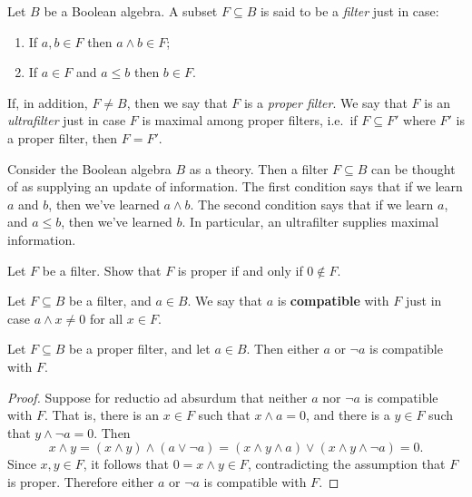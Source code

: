 \begin{defn} Let $B$ be a Boolean algebra.  A subset $F\subseteq B$ is
  said to be a \emph{filter} just in case:
\begin{enumerate}
\item If $a,b\in F$ then $a\wedge b\in F$;
\item If $a\in F$ and $a\leq b$ then $b\in F$.
\end{enumerate}
If, in addition, $F\neq B$, then we say that $F$ is a \emph{proper
  filter}.  We say that $F$ is an \emph{ultrafilter} just in case $F$
is maximal among proper filters, i.e.\ if $F\subseteq F'$ where $F'$
is a proper filter, then $F=F'$.
\end{defn}

\begin{disc} Consider the Boolean algebra $B$ as a theory.  Then a
  filter $F\subseteq B$ can be thought of as supplying an update of
  information.  The first condition says that if we learn $a$ and $b$,
  then we've learned $a\wedge b$.  The second condition says that if
  we learn $a$, and $a\leq b$, then we've learned $b$.  In particular,
  an ultrafilter supplies maximal information.  \end{disc}

\begin{exercise} Let $F$ be a filter.  Show that $F$ is proper if and
  only if $0\not\in F$. \end{exercise}






\begin{defn} Let $F\subseteq B$ be a filter, and $a\in B$.  We say
  that $a$ is \textbf{compatible} with $F$ just in case $a\wedge x\neq
  0$ for all $x\in F$. \end{defn}

\begin{lemma} Let $F\subseteq B$ be a proper filter, and let $a\in B$.
  Then either $a$ or $\neg a$ is compatible with
  $F$. \label{compatible} \end{lemma}

\begin{proof} Suppose for reductio ad absurdum that neither $a$ nor
  $\neg a$ is compatible with $F$.  That is, there is an $x\in F$ such
  that $x\wedge a=0$, and there is a $y\in F$ such that $y\wedge \neg
  a=0$.  Then
$$ x\wedge y = (x\wedge y)\wedge (a\vee \neg a) =  (x\wedge y\wedge
a)\vee (x\wedge y\wedge \neg a) = 0 .$$ Since $x,y\in F$, it follows
that $0=x\wedge y\in F$, contradicting the assumption that $F$ is
proper.  Therefore either $a$ or $\neg a$ is compatible with $F$.
\end{proof}

